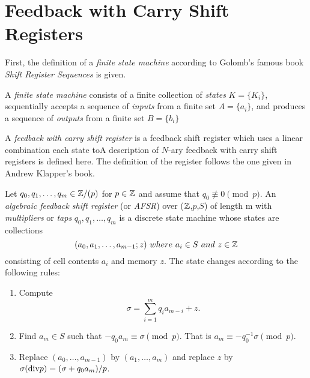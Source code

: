 \section{Feedback with Carry Shift Registers}
\par First, the definition of a {\em finite state machine}
according to Golomb's famous book {\em Shift Register Sequences}
is given.

\begin{definition}\label{finite-state-machine}
  A {\em finite state machine} consists of a finite collection
  of {\em states} $K=\{K_i\}$, sequentially accepts a sequence
  of {\em inputs} from a finite set $A=\{a_i\}$, and produces
  a sequence of {\em outputs} from a finite set $B=\{b_i\}$
\end{definition}
\par A {\em feedback with carry shift register} is a feedback shift register
which uses a linear combination each state toA description of $N$-ary feedback with carry shift registers is defined here.
The definition of the register follows the one given in Andrew Klapper's book.

\begin{definition}\label{afsr}
  Let $q_0,q_1,\dots,q_m\in\mathbb{Z}/(p)$ for $p\in\mathbb{Z}$ and assume that $q_0\not\equiv0\pmod p$.
  An {\em algebraic feedback shift register} (or {\em AFSR}) over ($\mathbb{Z}$,$p$,$S$) of length m with
  {\em multipliers} or {\em taps} $q_0,q_1,\dots,q_m$ is a discrete state machine whose states are
  collections
  \[
  (a_0,a_1,\dots,a_{m-1};z) \ where \ a_i\in S \ and \ z \in \zzz
  \]
  consisting of cell contents $a_i$ and memory $z$. The state changes according to the
  following rules:
  \begin{enumerate}[1.]
    \item Compute
      \[
      \sigma = \sum^m_{i=1}q_ia_{m-i}+z.
      \]
    \item Find $a_m\in S$ such that $-q_0a_m\equiv\sigma\pmod p$. That is $a_m\equiv-q_{0}^{-1}\sigma\pmod p$.
    \item Replace $(a_0,\dots,a_{m-1})$ by $(a_1,\dots,a_m)$ and replace $z$ by $\sigma({\rm div} p) = (\sigma+q_0a_m)/p$.
  \end{enumerate}
\end{definition}
